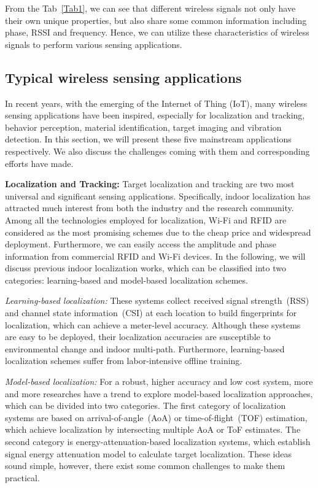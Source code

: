 From the Tab~\ref{Tab1}, we can see that different wireless signals not only have their own unique properties, but also share some common information including phase, RSSI and frequency. Hence, we can utilize these characteristics of wireless signals to perform various sensing applications.


\subsection{Typical wireless sensing applications}
In recent years, with the emerging of the Internet of Thing (IoT), many wireless sensing applications have been inspired, especially for localization and tracking, behavior perception, material identification, target imaging and vibration detection. In this section, we will present these five mainstream applications respectively. We also discuss the challenges coming with them and corresponding efforts have made.

\textbf{Localization and Tracking:} Target localization and tracking are two most universal and significant sensing applications. Specifically, indoor localization has attracted much interest from both the industry and the research community. Among all the technologies employed for localization, Wi-Fi and RFID are considered as the most promising schemes due to the cheap price and widespread deployment. Furthermore, we can easily access the amplitude and phase information from commercial RFID and Wi-Fi devices. In the following, we will discuss previous indoor localization works, which can be classified into two categories: learning-based and model-based localization schemes.

\emph{Learning-based localization:} These systems collect received signal strength~(RSS) and channel state information~(CSI) at each location to build fingerprints for localization, which can achieve a meter-level accuracy. Although these systems are easy to be deployed, their localization accuracies are susceptible to environmental change and indoor multi-path. Furthermore, learning-based localization schemes suffer from labor-intensive offline training.

\emph{Model-based localization:} For a robust, higher accuracy and low cost system, more and more researches have a trend to explore model-based localization approaches, which can be divided into two categories. The first category of localization systems are based on arrival-of-angle~(AoA) or time-of-flight~(TOF) estimation, which achieve localization by intersecting multiple AoA or ToF estimates. The second category is energy-attenuation-based localization systems, which establish signal energy attenuation model to calculate target localization. These ideas sound simple, however, there exist some common challenges to make them practical.

